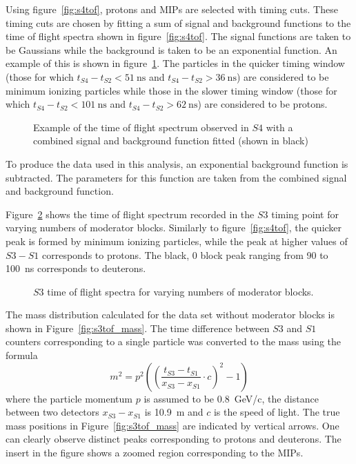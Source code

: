 	Using figure~\ref{fig:s4tof}, protons and MIPs are selected with timing cuts. 
	These timing cuts are chosen by fitting a sum of signal and background functions to the time of flight spectra shown in figure~\ref{fig:s4tof}. 
	The signal functions are taken to be Gaussians while the background is taken to be an exponential function. 
	An example of this is shown in figure~\ref{fig:fitEx}.
	The particles in the quicker timing window (those for which $t_{S4}-t_{S2}<51~\text{ns}$ and $t_{S4}-t_{S2}>36~\text{ns}$) are considered to be minimum ionizing particles while those in the slower timing window (those for which $t_{S4}-t_{S2}<101~\text{ns}$ and $t_{S4}-t_{S2}>62~\text{ns}$) are considered to be protons.
	
	\begin{figure}[h]
		\begin{adjustbox}{max totalsize={.7\textwidth}{.62\textheight},center}
			
		\end{adjustbox}
		\caption{Example of the time of flight spectrum observed in $S4$ with a combined signal and background function fitted (shown in black)}
		\label{fig:fitEx}
	\end{figure}

	To produce the data used in this analysis, an exponential background function is subtracted. 
	The parameters for this function are taken from the combined signal and background function.

	Figure~\ref{fig:s3tof} shows the time of flight spectrum recorded in the $S3$ timing point for varying numbers of moderator blocks.
	Similarly to figure~\ref{fig:s4tof}, the quicker peak is formed by minimum ionizing particles, while the peak at higher values of $S3 - S1$ corresponds to protons.
	The black, 0 block peak ranging from 90 to 100~ns corresponds to deuterons.
	\begin{figure}[h]
		\begin{adjustbox}{max totalsize={.8\textwidth}{.5\textheight},center}
			
		\end{adjustbox}
		\caption{$S3$ time of flight spectra for varying numbers of moderator blocks.}
		\label{fig:s3tof}
	\end{figure}


    The mass distribution calculated for the data set without moderator blocks is shown in Figure~\ref{fig:s3tof_mass}. The time difference between $S3$ and $S1$ counters corresponding to a single particle was converted to the mass using the formula
    \begin{equation} 
     m^2 = p^2 \left( 
     \left(\frac{t_{S3}-t_{S1}}{x_{S3}-x_{S1}} \cdot c \right)^2
    - 1  \right)
    \end{equation}
    where the particle momentum $p$ is assumed to be 0.8~GeV/c, the distance between two detectors $x_{S3}-x_{S1}$ is 10.9~m and $c$ is the speed of light. 
    The true mass positions in Figure~\ref{fig:s3tof_mass} are indicated by vertical arrows. One can clearly observe distinct peaks corresponding to protons and deuterons. 
    The insert in the figure shows a zoomed region corresponding to the MIPs. 
    


